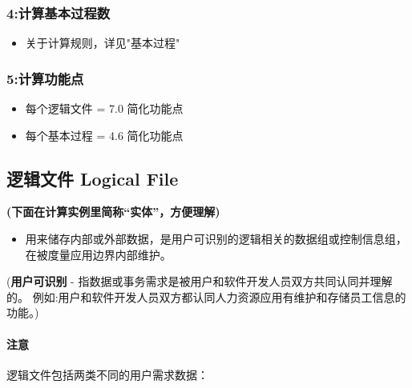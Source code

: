 \hypertarget{ux8ba1ux7b97ux57faux672cux8fc7ux7a0bux6570}{%
\subsubsection{4:计算基本过程数}\label{ux8ba1ux7b97ux57faux672cux8fc7ux7a0bux6570}}

\begin{itemize}
\tightlist
\item
  关于计算规则，详见"基本过程"
\end{itemize}

\hypertarget{ux8ba1ux7b97ux529fux80fdux70b9}{%
\subsubsection{5:计算功能点}\label{ux8ba1ux7b97ux529fux80fdux70b9}}

\begin{itemize}
\tightlist
\item
  每个逻辑文件 = 7.0 简化功能点
\item
  每个基本过程 = 4.6 简化功能点
\end{itemize}

\hypertarget{ux903bux8f91ux6587ux4ef6-logical-file}{%
\subsection{逻辑文件 Logical
File}\label{ux903bux8f91ux6587ux4ef6-logical-file}}

\textbf{(下面在计算实例里简称``实体''，方便理解)}

\begin{itemize}
\tightlist
\item
  用来储存内部或外部数据，是用户可识别的逻辑相关的数据组或控制信息组，在被度量应用边界内部维护。
\end{itemize}

\begin{description}
\tightlist
\item[]
(\textbf{用户可识别} -
指数据或事务需求是被用户和软件开发人员双方共同认同并理解的。
例如:用户和软件开发人员双方都认同人力资源应用有维护和存储员工信息的功能。)
\end{description}

\hypertarget{ux6ce8ux610f}{%
\paragraph{注意}\label{ux6ce8ux610f}}

逻辑文件包括两类不同的用户需求数据：

